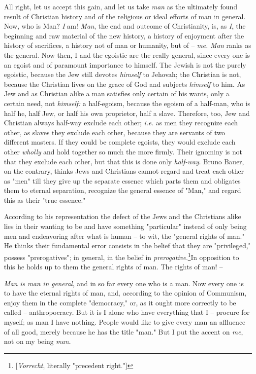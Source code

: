\documentclass[a4paper]{book}
\begin{document}
All right, let us accept this gain, and let us take \textit{man} as the 
ultimately found result of Christian history and of the religious or ideal 
efforts of man in general. Now, who is Man? \textit{I} am! \textit{Man}, the 
end and outcome of Christianity, is, as \textit{I}, the beginning and raw 
material of the new history, a history of enjoyment after the history of 
sacrifices, a history not of man or humanity, but of -- \textit{me. Man} ranks 
as the general. Now then, I and the egoistic are the really general, since 
every one is an egoist and of paramount importance to himself. The Jewish is 
not the purely egoistic, because the Jew still devotes \textit{himself} to 
Jehovah; the Christian is not, because the Christian lives on the grace of God 
and subjects \textit{himself} to him. As Jew and as Christian alike a man 
satisfies only certain of his wants, only a certain need, not 
\textit{himself:} a half-egoism, because the egoism of a half-man, who is half 
he, half Jew, or half his own proprietor, half a slave. Therefore, too, Jew 
and Christian always half-way exclude each other; \textit{i.e.} as men they 
recognize each other, as slaves they exclude each other, because they are 
servants of two different masters. If they could be complete egoists, they 
would exclude each other \textit{wholly} and hold together so much the more 
firmly. Their ignominy is not that they exclude each other, but that this is 
done only \textit{half-way}. Bruno Bauer, on the contrary, thinks Jews and 
Christians cannot regard and treat each other as "{}men"{} till they give up 
the separate essence which parts them and obligates them to eternal 
separation, recognize the general essence of "{}Man,"{} and regard this as 
their "{}true essence."{}

According to his representation the defect of the Jews and the Christians 
alike lies in their wanting to be and have something "{}particular"{} instead 
of only being men and endeavoring after what is human -- to wit, the 
"{}general rights of man."{} He thinks their fundamental error consists in the 
belief that they are "{}privileged,"{} possess "{}prerogatives"{}; in general, 
in the belief in \textit{prerogative}.\footnote{[\textit{Vorrecht}, literally 
"{}precedent right."{}] }In opposition to this he holds up to them the general 
rights of man. The rights of man! --

\textit{Man is man in general}, and in so far every one who is a man. Now 
every one is to have the eternal rights of man, and, according to the opinion 
of Communism, enjoy them in the complete "{}democracy,"{} or, as it ought more 
correctly to be called -- anthropocracy. But it is I alone who have everything 
that I -- procure for myself; as man I have nothing. People would like to give 
every man an affluence of all good, merely because he has the title "{}man."{} 
But I put the accent on \textit{me}, not on my being \textit{man}.
\end{document}

